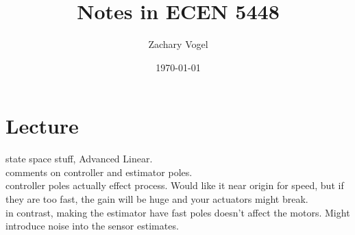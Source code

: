 \documentclass{article}
\author{Zachary Vogel}
\date{\today}
\title{Notes in ECEN 5448}
\begin{document}
\maketitle


\section*{Lecture}
state space stuff, Advanced Linear.\\
comments on controller and estimator poles.\\
controller poles actually effect process. Would like it near origin for speed, but if they are too fast, the gain will be huge and your actuators might break.\\

in contrast, making the estimator have fast poles doesn't affect the motors. Might introduce noise into the sensor estimates.\\
\end{document}

